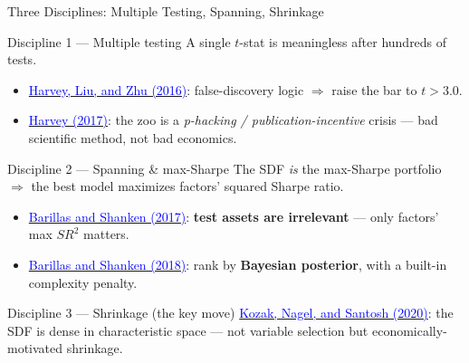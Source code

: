 \documentclass{beamer}
\begin{document}
\begin{frame}{Three Disciplines: Multiple Testing, Spanning, Shrinkage}
\small
\begin{block}{Discipline 1 --- Multiple testing}
A single $t$-stat is meaningless after hundreds of tests.
\begin{itemize}
\item \href{https://doi.org/10.1093/rfs/hhv059}{\textcolor{blue}{Harvey, Liu, and Zhu (2016)}}: false-discovery logic $\Rightarrow$ raise the bar to $t > 3.0$.
\item \href{https://doi.org/10.1111/jofi.12530}{\textcolor{blue}{Harvey (2017)}}: the zoo is a \textit{p-hacking / publication-incentive} crisis --- bad scientific method, not bad economics.
\end{itemize}
\end{block}
\begin{block}{Discipline 2 --- Spanning \& max-Sharpe}
The SDF \textit{is} the max-Sharpe portfolio $\Rightarrow$ the best model maximizes factors' squared Sharpe ratio.
\begin{itemize}
\item \href{https://doi.org/10.1093/rfs/hhw101}{\textcolor{blue}{Barillas and Shanken (2017)}}: \textbf{test assets are irrelevant} --- only factors' max $SR^2$ matters.
\item \href{https://doi.org/10.1111/jofi.12607}{\textcolor{blue}{Barillas and Shanken (2018)}}: rank by \textbf{Bayesian posterior}, with a built-in complexity penalty.
\end{itemize}
\end{block}
\begin{block}{Discipline 3 --- Shrinkage (the key move)}
\href{https://doi.org/10.1016/j.jfineco.2019.06.008}{\textcolor{blue}{Kozak, Nagel, and Santosh (2020)}}: the SDF is \alert{dense} in characteristic space --- not variable selection but economically-motivated shrinkage.
\end{block}
\end{frame}
\end{document}

